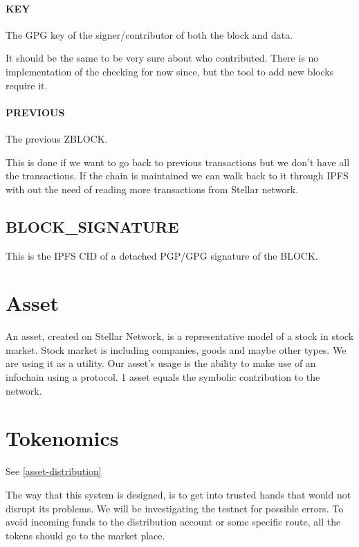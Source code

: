 \documentclass[10pt,a4paper,twocolumn]{paper}
\begin{document}
	\paragraph{KEY}\label{key}
	The GPG key of the signer/contributor of both the block and data.
	 
	 
	It should be the same to be very sure about who contributed. There is no implementation of the checking for now since, but the tool to add new blocks require it.
	 
	\paragraph{PREVIOUS}\label{previous}
	The previous ZBLOCK.
	 
	 
	This is done if we want to go back to previous transactions but we don't have all the transactions. If the chain is maintained we can walk back to it through IPFS with out the need of reading more transactions from Stellar network.
	
	
	\subsection{BLOCK\_SIGNATURE}\label{block-signature}
	This is the IPFS CID of a detached PGP/GPG signature of the BLOCK.
	
	
	\section{Asset}\label{asset}
	An asset, created on Stellar Network, is a representative model of a stock in stock market. Stock market is including companies, goods and maybe other types. We are using it as a utility. Our asset's usage is the ability to make use of an infochain using a protocol. 1 asset equals the symbolic contribution to the network.

	\section{Tokenomics}\label{tokenomics}
	See \ref{asset-distribution}
	
	The way that this system is designed, is to get into trusted hands that would not disrupt its problems. We will be investigating the testnet for possible errors. To avoid incoming funds to the distribution account or some specific route, all the tokens should go to the market place.
\end{document}
